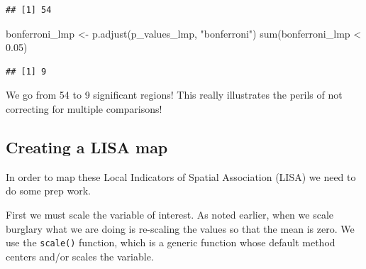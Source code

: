 \documentclass[
  krantz2]{krantz}
\makeatletter
\newenvironment{Shaded}{\begin{snugshade}}{\end{snugshade}}
\newcommand{\AttributeTok}[1]{\textcolor[rgb]{0.61,0.61,0.61}{#1}}
\newcommand{\DecValTok}[1]{\textcolor[rgb]{0.06,0.06,0.06}{#1}}
\newcommand{\FloatTok}[1]{\textcolor[rgb]{0.06,0.06,0.06}{#1}}
\newcommand{\FunctionTok}[1]{\textcolor[rgb]{0,0,0}{#1}}
\newcommand{\NormalTok}[1]{#1}
\newcommand{\OtherTok}[1]{\textcolor[rgb]{0.37,0.37,0.37}{#1}}
\newcommand{\SpecialCharTok}[1]{\textcolor[rgb]{0,0,0}{#1}}
\newcommand{\StringTok}[1]{\textcolor[rgb]{0.5,0.5,0.5}{#1}}
\newenvironment{kframe}{%
\medskip{}
\setlength{\fboxsep}{.8em}
 \def\at@end@of@kframe{}%
 \ifinner\ifhmode%
  \def\at@end@of@kframe{\end{minipage}}%
  \begin{minipage}{\columnwidth}%
 \fi\fi%
 \def\FrameCommand##1{\hskip\@totalleftmargin \hskip-\fboxsep
 \colorbox{shadecolor}{##1}\hskip-\fboxsep
     \hskip-\linewidth \hskip-\@totalleftmargin \hskip\columnwidth}%
 \MakeFramed {\advance\hsize-\width
   \@totalleftmargin\z@ \linewidth\hsize
   \@setminipage}}%
 {\par\unskip\endMakeFramed%
 \at@end@of@kframe}
\renewenvironment{Shaded}{\begin{kframe}}{\end{kframe}}
\makeatother
\begin{document}
\begin{Shaded}
\end{Shaded}

\begin{verbatim}
## [1] 54
\end{verbatim}

\begin{Shaded}
\begin{Highlighting}[]
\NormalTok{bonferroni\_lmp }\OtherTok{\textless{}{-}} \FunctionTok{p.adjust}\NormalTok{(p\_values\_lmp, }\StringTok{"bonferroni"}\NormalTok{)}
\FunctionTok{sum}\NormalTok{(bonferroni\_lmp }\SpecialCharTok{\textless{}} \FloatTok{0.05}\NormalTok{)}
\end{Highlighting}
\end{Shaded}

\begin{verbatim}
## [1] 9
\end{verbatim}

We go from 54 to 9 significant regions! This really illustrates the perils of not correcting for multiple comparisons!

\hypertarget{creating-a-lisa-map}{%
\subsection{Creating a LISA map}\label{creating-a-lisa-map}}

In order to map these Local Indicators of Spatial Association (LISA) we need to do some prep work.

First we must scale the variable of interest. As noted earlier, when we scale burglary what we are doing is re-scaling the values so that the mean is zero. We use the \texttt{scale()} function, which is a generic function whose default method centers and/or scales the variable.
\end{document}
